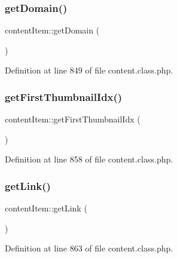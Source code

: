 \hypertarget{classcontentItem_a7a513d119938877566418029c6124a45}{}\label{classcontentItem_a7a513d119938877566418029c6124a45} 
\subsubsection{\texorpdfstring{get\+Domain()}{getDomain()}}
{\footnotesize\ttfamily content\+Item\+::get\+Domain (\begin{DoxyParamCaption}{ }\end{DoxyParamCaption})}



Definition at line 849 of file content.\+class.\+php.

\hypertarget{classcontentItem_a0de8d1dad2347b9f91bc4f16df2c4a12}{}\label{classcontentItem_a0de8d1dad2347b9f91bc4f16df2c4a12} 
\subsubsection{\texorpdfstring{get\+First\+Thumbnail\+Idx()}{getFirstThumbnailIdx()}}
{\footnotesize\ttfamily content\+Item\+::get\+First\+Thumbnail\+Idx (\begin{DoxyParamCaption}{ }\end{DoxyParamCaption})}



Definition at line 858 of file content.\+class.\+php.

\hypertarget{classcontentItem_a8e5d8c09bab20f5a0cd0874504cf5a5e}{}\label{classcontentItem_a8e5d8c09bab20f5a0cd0874504cf5a5e} 
\subsubsection{\texorpdfstring{get\+Link()}{getLink()}}
{\footnotesize\ttfamily content\+Item\+::get\+Link (\begin{DoxyParamCaption}{ }\end{DoxyParamCaption})}



Definition at line 863 of file content.\+class.\+php.

